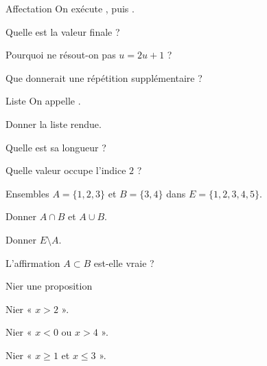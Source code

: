 \exercices
{}
\begingroup\renewcommand{\otBesoinPlace}[1]{}\begin{minipage}{\linewidth}
\begin{exercice}[1]{Affectation}
On exécute , puis .
\begin{questions}
\item Quelle est la valeur finale ?
\item Pourquoi ne résout-on pas $u=2u+1$ ?
\item Que donnerait une répétition supplémentaire ?
\end{questions}
\end{exercice}
\begin{exercice}[1]{Liste}
On appelle .
\begin{questions}
\item Donner la liste rendue.
\item Quelle est sa longueur ?
\item Quelle valeur occupe l’indice $2$ ?
\end{questions}
\end{exercice}
\begin{exercice}[1]{Ensembles}
$A=\{1,2,3\}$ et $B=\{3,4\}$ dans $E=\{1,2,3,4,5\}$.
\begin{questions}
\item Donner $A\cap B$ et $A\cup B$.
\item Donner $E\setminus A$.
\item L’affirmation $A\subset B$ est-elle vraie ?
\end{questions}
\end{exercice}
\begin{exercice}[1]{Nier une proposition}

\begin{questions}
\item Nier « $x>2$ ».
\item Nier « $x<0$ ou $x>4$ ».
\item Nier « $x\geq1$ et $x\leq3$ ».
\end{questions}
\end{exercice}
\end{minipage}\endgroup
\clearpage
{}
